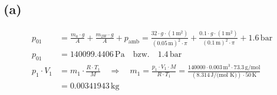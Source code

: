 

\subsection*{(a)}
\begin{align*}
p_{01} &= \frac{m_a \cdot g}{A} + \frac{m_{2W} \cdot g}{A} + p_{\text{amb}} = \frac{32 \cdot g \cdot (1 \, \text{m}^2)}{(0.05 \, \text{m})^2 \cdot \pi} + \frac{0.1 \cdot g \cdot (1 \, \text{m}^2)}{(0.1 \, \text{m})^2 \cdot \pi} + 1.6 \, \text{bar} \\
p_{01} &= 140099.4406 \, \text{Pa} \quad \text{bzw.} \quad 1.4 \, \text{bar} \\
p_1 \cdot V_1 &= m_1 \cdot \frac{R \cdot T_1}{M} \quad \Rightarrow \quad m_1 = \frac{p_1 \cdot V_1 \cdot M}{R \cdot T_1} = \frac{140000 \cdot 0.003 \, \text{m}^3 \cdot 73.3 \, \text{g/mol}}{(8.314 \, \text{J/(mol K)}) \cdot 50 \, \text{K}} \\
&= 0.00341943 \, \text{kg}
\end{align*}